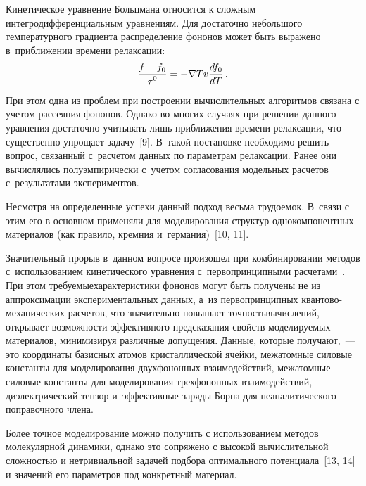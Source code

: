\begin{multicols}{2}
    Кинетическое уравнение Больцмана относится к сложным 
    ин\-тег\-ро\-диф\-фе\-рен\-ци\-аль\-ным уравнениям. Для достаточно небольшого температурного 
градиента распределение фононов может быть выражено в~приближении 
времени релаксации:
    \begin{equation*}
    \displaystyle\frac{\displaystyle f-f_0\mathstrut}{\displaystyle \tau^0\mathstrut}=-\nabla T v \displaystyle\frac{\displaystyle df_0\mathstrut}{\displaystyle dT\mathstrut}\,.
        \end{equation*}
    При этом одна из проблем при построении вычислительных алгоритмов 
связана с учетом рассеяния фононов. Однако во многих случаях при решении 
данного уравнения достаточно учитывать лишь приближения времени 
релаксации, что существенно упрощает задачу~[9]. В~такой постановке 
необходимо решить вопрос, связанный с~расчетом данных по параметрам 
релаксации. Ранее они вычислялись полуэмпирически с~учетом согласования 
модельных расчетов с~результатами экспериментов. 

Несмотря на определенные 
успехи данный подход весьма трудоемок. В~связи с этим его в основном 
применяли для моделирования структур однокомпонентных материалов (как 
правило, кремния и~германия)~[10, 11]. 

Значительный прорыв в~данном вопросе 
произошел при комбинировании методов с~использованием кинетического 
уравнения с~первопринципными  
расчетами~\cite{8-ab, 9-ab, 12-ab}. При этом требуемые\linebreak \mbox{характеристики} фононов 
могут быть получены не из аппроксимации экспериментальных %
 данных, а~из 
первопринципных кван\-то\-во-ме\-ха\-ни\-че\-ских расчетов, что значительно 
повышает точность\linebreak вычислений, открывает возможности эффективного 
пред\-ска\-за\-ния свойств моделируемых {материалов}, минимизируя 
различные допущения. \mbox{Данные}, которые получают,~--- это координаты 
базисных атомов кристаллической ячейки, межатомные силовые константы для 
моделирования двухфононных взаимодействий, межатомные силовые 
константы для моделирования трехфононных \mbox{взаимодействий}, диэлектрический 
тензор и~эффективные заряды Борна для неаналитического поправочного члена.
    
    Более точное моделирование можно получить с использованием методов 
молекулярной динамики, однако это сопряжено с высокой вычислительной 
сложностью и нетривиальной задачей подбора оптимального потенциала~[13, 
14] и значений его параметров под конкретный материал. 
    

\end{multicols}
